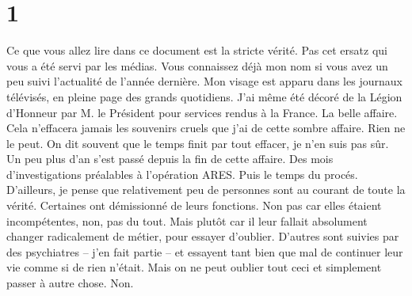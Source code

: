 \chapter*{1}
\begin{epigraphs}
\end{epigraphs}

Ce que vous allez lire dans ce document est la stricte vérité. Pas cet ersatz
qui vous a été servi par les médias. Vous connaissez déjà mon nom si vous avez
un peu suivi l’actualité de l’année dernière. Mon visage est apparu dans les
journaux télévisés, en pleine page des grands quotidiens. J’ai même été décoré
de la Légion d’Honneur par M. le Président pour services rendus à la France. La
belle affaire. Cela n'effacera jamais les souvenirs cruels que j'ai de cette
sombre affaire. Rien ne le peut. On dit souvent que le temps finit par tout 
effacer, je n'en suis pas sûr. Un peu plus d'an s'est passé depuis la fin de
cette affaire. Des mois d'investigations préalables à l'opération ARES. Puis le 
temps du procés. D’ailleurs, je pense que relativement peu de personnes sont au
courant de toute la vérité. Certaines ont démissionné de leurs fonctions. Non 
pas car elles étaient incompétentes, non, pas du tout. Mais plutôt car il leur 
fallait absolument changer radicalement de métier, pour essayer d'oublier. 
D'autres sont suivies par des psychiatres – j'en fait partie – et essayent tant 
bien que mal de continuer leur vie comme si de rien n'était. Mais on ne peut 
oublier tout ceci et simplement passer à autre chose. Non. 

